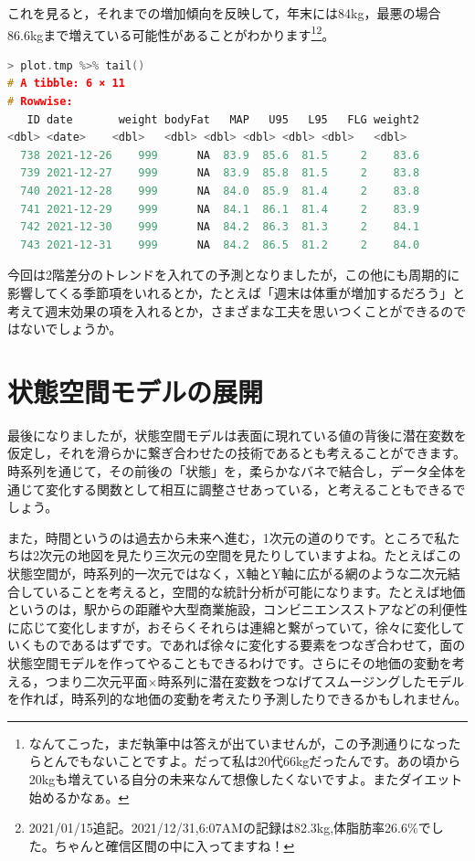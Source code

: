 \documentclass{ltjsbook}
\begin{document}
これを見ると，それまでの増加傾向を反映して，年末には84kg，最悪の場合86.6kgまで増えている可能性があることがわかります\footnote{なんてこった，まだ執筆中は答えが出ていませんが，この予測通りになったらとんでもないことですよ。だって私は20代66kgだったんです。あの頃から20kgも増えている自分の未来なんて想像したくないですよ。またダイエット始めるかなぁ。}\footnote{2021/01/15追記。2021/12/31,6:07AMの記録は82.3kg,体脂肪率26.6\%でした。ちゃんと確信区間の中に入ってますね！}。

\begin{lstlisting}[language=c++,label={code:29_06},caption={2階差分トレンドで予想される2021年末の体重(一部略)}]
> plot.tmp %>% tail()
# A tibble: 6 × 11
# Rowwise: 
   ID date       weight bodyFat   MAP   U95   L95   FLG weight2
<dbl> <date>    <dbl>   <dbl> <dbl> <dbl> <dbl> <dbl>   <dbl>
  738 2021-12-26    999      NA  83.9  85.6  81.5     2    83.6
  739 2021-12-27    999      NA  83.9  85.8  81.5     2    83.8
  740 2021-12-28    999      NA  84.0  85.9  81.4     2    83.8
  741 2021-12-29    999      NA  84.1  86.1  81.4     2    83.9
  742 2021-12-30    999      NA  84.2  86.3  81.3     2    84.1
  743 2021-12-31    999      NA  84.2  86.5  81.2     2    84.0
\end{lstlisting}

今回は2階差分のトレンドを入れての予測となりましたが，この他にも周期的に影響してくる季節項をいれるとか，たとえば「週末は体重が増加するだろう」と考えて週末効果の項を入れるとか，さまざまな工夫を思いつくことができるのではないでしょうか。

\section{状態空間モデルの展開}
最後になりましたが，状態空間モデルは表面に現れている値の背後に潜在変数を仮定し，それを滑らかに繋ぎ合わせたの技術であるとも考えることができます。時系列を通じて，その前後の「状態」を，柔らかなバネで結合し，データ全体を通じて変化する関数として相互に調整させあっている，と考えることもできるでしょう。

また，時間というのは過去から未来へ進む，1次元の道のりです。ところで私たちは2次元の地図を見たり三次元の空間を見たりしていますよね。たとえばこの状態空間が，時系列的一次元ではなく，X軸とY軸に広がる網のような二次元結合していることを考えると，空間的な統計分析が可能になります。たとえば地価というのは，駅からの距離や大型商業施設，コンビニエンスストアなどの利便性に応じて変化しますが，おそらくそれらは連綿と繋がっていて，徐々に変化していくものであるはずです。であれば徐々に変化する要素をつなぎ合わせて，面の状態空間モデルを作ってやることもできるわけです。さらにその地価の変動を考える，つまり二次元平面$\times$時系列に潜在変数をつなげてスムージングしたモデルを作れば，時系列的な地価の変動を考えたり予測したりできるかもしれません。
\end{document}
